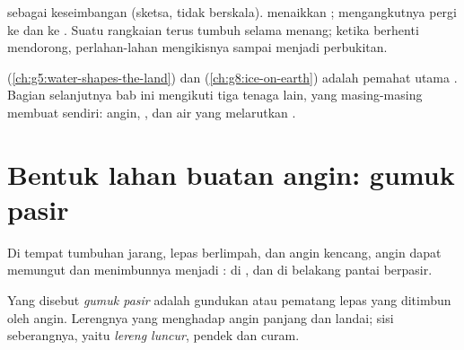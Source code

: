 \begin{omfigure}
{\small {} sebagai keseimbangan (sketsa, tidak berskala). 
menaikkan ;  mengangkutnya pergi ke  dan ke . Suatu
rangkaian  terus tumbuh selama  menang; ketika
 berhenti mendorong,  perlahan-lahan mengikisnya
sampai menjadi perbukitan.}
\label{fig:g9:landforms:balance}
\end{omfigure}

 (\cref{ch:g5:water-shapes-the-land}) dan 
(\cref{ch:g8:ice-on-earth}) adalah pemahat utama . Bagian
selanjutnya bab ini mengikuti tiga tenaga lain, yang masing-masing
membuat  sendiri: angin, , dan air yang melarutkan
.

\section{Bentuk lahan buatan angin: gumuk pasir}

Di tempat tumbuhan jarang,  lepas berlimpah, dan angin kencang,
angin dapat memungut  dan menimbunnya menjadi : di , dan di
belakang pantai berpasir.

\begin{definition}\label{def:g9:landforms:dune}
Yang disebut \emph{gumuk pasir} adalah gundukan atau
pematang  lepas yang ditimbun oleh angin. Lerengnya yang menghadap
angin panjang dan landai; sisi seberangnya, yaitu \emph{lereng
luncur}, pendek dan curam.
\end{definition}

